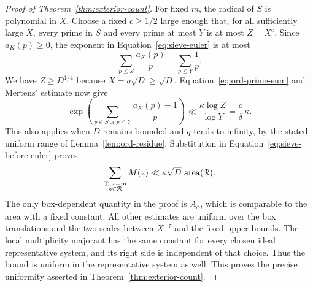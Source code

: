\begin{proof}[Proof of Theorem~\ref{thm:exterior-count}]
For fixed $m$, the radical of $S$ is polynomial in $X$.  Choose a fixed
$c\ge1/2$ large enough that, for all sufficiently large $X$, every prime
in $S$ and every prime at most $Y$ is at most $Z=X^c$.  Since
$a_K(p)\ge0$, the exponent in Equation~\eqref{eq:sieve-euler} is at most
\[
 \sum_{p\le Z}\frac{a_K(p)}p-\sum_{p\le Y}\frac1p.
\]
We have $Z\ge D^{1/4}$ because $X=q\sqrt D\ge\sqrt D$.
Equation~\eqref{eq:ord-prime-sum} and Mertens' estimate now give
\[
 \exp\left(\sum_{p\in S\ \mathrm{or}\ p\le Y}
                    \frac{a_K(p)-1}{p}\right)
 \ll \frac{\kappa\log Z}{\log Y}
 =\frac c\delta\,\kappa.
\]
This also applies when $D$ remains bounded and $q$ tends to infinity,
by the stated uniform range of Lemma~\ref{lem:ord-residue}.
Substitution in Equation~\eqref{eq:sieve-before-euler} proves
\[
 \sum_{\substack{\operatorname{Tr} z=m\\z\in\mathcal R}}M(z)
       \ll\kappa\sqrt D\,\operatorname{area}(\mathcal R).
\]
The only box-dependent quantity in the proof is $A_\phi$, which is
comparable to the area with a fixed constant.  All other estimates are
uniform over the box translations and the two scales between
$X^{-\tau}$ and the fixed upper bounds.  The local multiplicity majorant
has the same constant for every chosen ideal representative system, and
its right side is independent of that choice.  Thus the bound is uniform
in the representative system as well.  This proves the precise
uniformity asserted in Theorem~\ref{thm:exterior-count}.
\end{proof}

